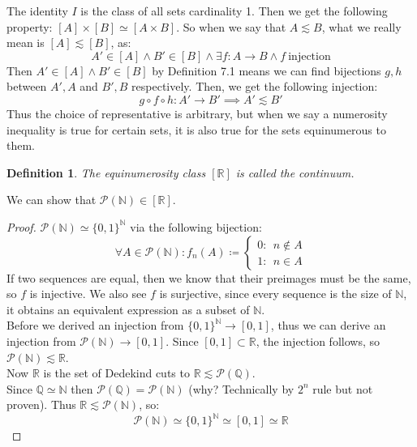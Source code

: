 \documentclass{article}
\newtheorem{defn}{Definition}[section]
\begin{document}
The identity $I$ is the class of all sets cardinality 1. Then we get the following property: $[A] \times [B] \simeq [A \times B]$. So when we say that $A \lesssim B$, what we really mean is $[A] \lesssim [B]$, as:
\begin{equation*}
    A' \in [A] \land B' \in [B] \land \exists f: A \xrightarrow{} B \land f \ \text{injection}
\end{equation*}
Then $A' \in [A] \land B' \in [B]$ by Definition 7.1 means we can find bijections $g, h$ between $A', A$ and $B', B$ respectively. Then, we get the following injection:
\begin{equation*}
    g \circ f \circ h: A' \xrightarrow{} B' \implies A' \lesssim B'
\end{equation*}
Thus the choice of representative is arbitrary, but when we say a numerosity inequality is true for certain sets, it is also true for the sets equinumerous to them.

\medskip
\begin{defn}
The equinumerosity class $[\mathbb{R}]$ is called the continuum.
\end{defn}
We can show that $\mathcal{P}(\mathbb{N}) \in [\mathbb{R}]$.
\begin{proof}
$\mathcal{P}(\mathbb{N}) \simeq \{0, 1\}^\mathbb{N}$ via the following bijection:
\begin{equation*}
    \forall A \in \mathcal{P}(\mathbb{N}): f_n(A) \coloneq \begin{cases}
        0: \ \ n \notin A\\
        1: \ \ n \in A
    \end{cases}
\end{equation*}
If two sequences are equal, then we know that their preimages must be the same, so $f$ is injective. We also see $f$ is surjective, since every sequence is the size of $\mathbb{N}$, it obtains an equivalent expression as a subset of $\mathbb{N}$.\\

Before we derived an injection from $\{0, 1\}^\mathbb{N} \xrightarrow{} [0, 1]$, thus we can derive an injection from $\mathcal{P}(\mathbb{N}) \xrightarrow{} [0, 1]$. Since $[0, 1] \subset \mathbb{R}$, the injection follows, so $\mathcal{P}(\mathbb{N}) \lesssim \mathbb{R}$.\\

Now $\mathbb{R}$ is the set of Dedekind cuts to $\mathbb{R} \lesssim \mathcal{P}(\mathbb{Q})$.\\

Since $\mathbb{Q} \simeq \mathbb{N}$ then $\mathcal{P}(\mathbb{Q}) = \mathcal{P}(\mathbb{N})$ (why? Technically by $2^n$ rule but not proven). Thus $\mathbb{R} \lesssim \mathcal{P}(\mathbb{N})$, so:
\begin{equation*}
    \mathcal{P}(\mathbb{N}) \simeq \{0, 1\}^\mathbb{N} \simeq [0, 1] \simeq \mathbb{R}
\end{equation*}
\end{proof}
\end{document}
